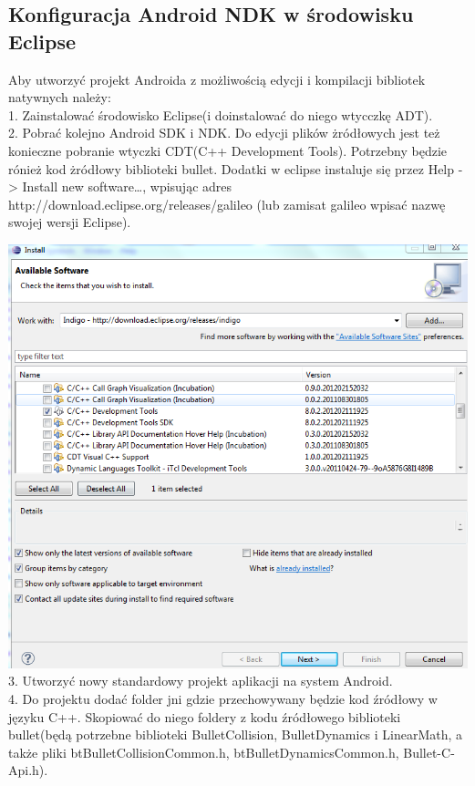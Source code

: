 \documentclass[12pt]{article}
\begin{document}
  \subsection{Konfiguracja Android NDK w środowisku Eclipse}
  Aby utworzyć projekt Androida z możliwością edycji i kompilacji bibliotek
  natywnych należy: \\
  1. Zainstalować środowisko Eclipse(i doinstalować do niego wtycczkę ADT).\\
  2. Pobrać kolejno Android SDK i NDK. Do edycji plików żródłowych jest
  też konieczne pobranie wtyczki CDT(C++ Development Tools). Potrzebny będzie
  rónież kod żródłowy biblioteki bullet. Dodatki w eclipse instaluje się przez
  Help -> Install new software\ldots , wpisując adres http://download.eclipse.org/releases/galileo (lub zamisat
  galileo wpisać nazwę swojej wersji Eclipse).
  
  \includegraphics[width=\textwidth]{./img/CDT.png}
  3. Utworzyć nowy standardowy projekt aplikacji na system Android.\\
  4. Do projektu dodać folder jni gdzie przechowywany będzie kod źródłowy w
  języku C++. Skopiować do niego foldery z kodu źródłowego biblioteki
  bullet(będą potrzebne biblioteki BulletCollision, BulletDynamics i
  LinearMath, a także pliki btBulletCollisionCommon.h,
  btBulletDynamicsCommon.h, Bullet-C-Api.h).
  
\end{document}
